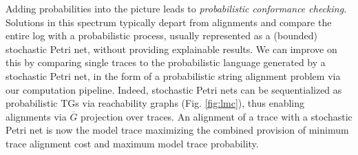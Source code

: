 Adding probabilities into the picture leads to 
\emph{probabilistic conformance checking}\cite{DBLP:conf/icpm/PolyvyanyyK19}. Solutions in this spectrum typically depart from alignments and compare the entire log with a probabilistic process, usually represented as a (bounded) stochastic Petri net, without providing explainable results. We can improve on this by  comparing single traces to the probabilistic language generated by a stochastic Petri net, in the form of a probabilistic string alignment problem via our computation pipeline. Indeed, stochastic Petri nets  can be sequentialized as probabilistic TGs via reachability graphs (Fig. \ref{fig:lmc}), thus enabling alignments via $\overline{G}$ projection over traces. An alignment of a trace with a stochastic Petri net is now the model trace maximizing the combined provision of minimum trace alignment cost and maximum model trace probability.








